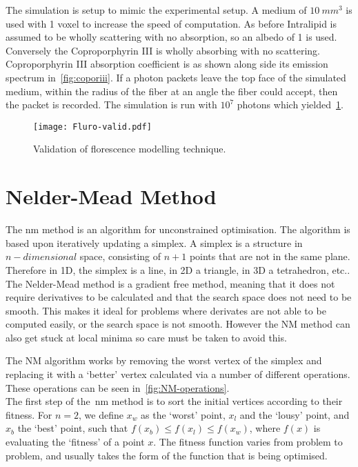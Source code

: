 The simulation is setup to mimic the experimental setup.
A medium of $10~mm^3$ is used with 1 voxel to increase the speed of computation.
As before Intralipid is assumed to be wholly scattering with no absorption, so an albedo of 1 is used.
Conversely the Coproporphyrin III is wholly absorbing with no scattering.
Coproporphyrin III absorption coefficient is as shown along side its emission spectrum in~\cref{fig:coporiii}.
If a photon packets leave the top face of the simulated medium, within the radius of the fiber at an angle the fiber could accept, then the packet is recorded.
The simulation is run with $10^7$ photons which yielded~\cref{fig:flurovalid}.

\begin{figure}[!htpb]
  \centering
  \texttt{[image: Fluro-valid.pdf]}
  \caption{Validation of florescence modelling technique.}
  \label{fig:flurovalid}
\end{figure}

\FloatBarrier

\section{Nelder-Mead Method}

The \gls*{nm} method is an algorithm for unconstrained optimisation. 
The algorithm is based upon iteratively updating a simplex. 
A simplex is a structure in $n-dimensional$ space, consisting of $n+1$ points that are not in the same plane. 
Therefore in 1D, the simplex is a line, in 2D a triangle, in 3D a tetrahedron, etc.. 
The Nelder-Mead method is a gradient free method, meaning that it does not require derivatives to be calculated and that the search space does not need to be smooth.
This makes it ideal for problems where derivates are not able to be computed easily, or the search space is not smooth.
However the NM method can also get stuck at local minima so care must be taken to avoid this.

The NM algorithm works by removing the worst vertex of the simplex and replacing it with a `better' vertex calculated via a number of different operations.
These operations can be seen in~\cref{fig:NM-operations}.\\

The first step of the~\gls*{nm} method is to sort the initial vertices according to their fitness.
For $n=2$, we define $x_w$ as the `worst' point, $x_l$ and the `lousy' point, and $x_b$ the `best' point, such that $f(x_b)\leq f(x_l)\leq f(x_w)$, where $f(x)$ is evaluating the `fitness' of a point $x$. 
The fitness function varies from problem to problem, and usually takes the form of the function that is being optimised.


